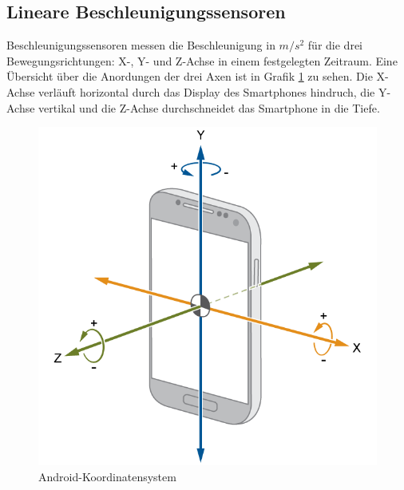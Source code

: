 \documentclass[11pt,a4paper]{report}
\begin{document}
\subsection*{Lineare Beschleunigungssensoren}
Beschleunigungssensoren messen die Beschleunigung in $m/s^2$ für die drei Bewegungsrichtungen: X-, Y- und Z-Achse in einem festgelegten Zeitraum.
Eine Übersicht über die Anordungen der drei Axen ist in Grafik \ref{fig:and_axes} zu sehen.
Die X-Achse verläuft horizontal durch das Display des Smartphones hindruch, die Y-Achse vertikal und die Z-Achse durchschneidet das Smartphone in die Tiefe.
\begin{figure}[htbp]
  \centering
  \includegraphics[width=.9\textwidth]{images/android_axes.png}
  \caption{Android-Koordinatensystem}
  \label{fig:and_axes}
\end{figure}
\end{document}
